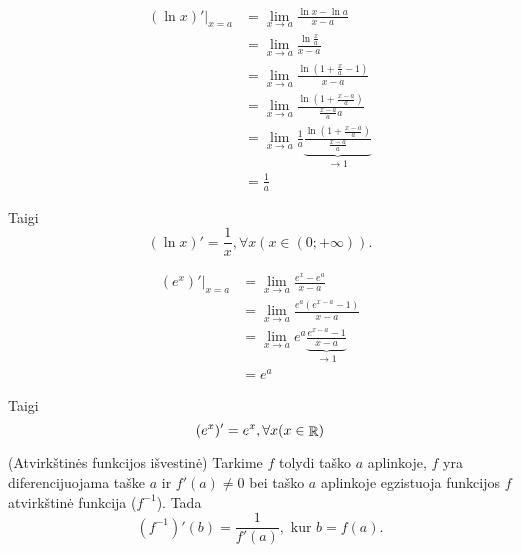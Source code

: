 \begin{exmp}
  \begin{align*}
    (\ln x)'|_{x = a}
    &= \lim_{x \to a} \frac{\ln x - \ln a}{x - a} \\
    &= \lim_{x \to a} \frac{\ln \frac{x}{a}}{x - a} \\
    &= \lim_{x \to a} 
      \frac{\ln \left( 1 + \frac{x}{a} - 1 \right)}{x - a} \\
    &= \lim_{x \to a} 
      \frac{\ln \left( 1 + \frac{x - a}{a} \right)}{\frac{x - a}{a} a} \\
    &= \lim_{x \to a} 
      \frac{1}{a}
      \underbrace{
        \frac{\ln \left( 1 + \frac{x - a}{a} \right)}{\frac{x - a}{a}}
        }_{\to 1} \\
    &= \frac{1}{a}
  \end{align*}

  Taigi
  \begin{equation*}
    (\ln x)' = \frac{1}{x}, \forall x (x \in (0; +\infty)).
  \end{equation*}
\end{exmp}

\begin{exmp}
  \begin{align*}
    (e^{x})'|_{x = a} 
    &= \lim_{x \to a} \frac{e^{x} - e^{a}}{x - a} \\
    &= \lim_{x \to a} \frac{e^{a} (e^{x-a} - 1)}{x - a} \\
    &= \lim_{x \to a} e^{a}
      \underbrace{\frac{e^{x - a} - 1}{x - a}}_{\to 1} \\
    &= e^{a}
  \end{align*}

  Taigi
  \begin{equation*}
    (e^{x})' = e^{x}, \forall x (x \in \mathop{\mathbb{R}})
  \end{equation*}
\end{exmp}

\begin{prop}
  (Atvirkštinės funkcijos išvestinė) Tarkime $f$ tolydi taško $a$ 
  aplinkoje, $f$ yra diferencijuojama taške $a$ ir $f'(a) \neq 0$ 
  bei taško $a$ aplinkoje egzistuoja funkcijos
  $f$ atvirkštinė funkcija ($f^{-1}$). Tada
  \begin{equation*}
    (f^{-1})'(b) = \frac{1}{f'(a)}, \text{ kur } b = f(a).
  \end{equation*}
\end{prop}

